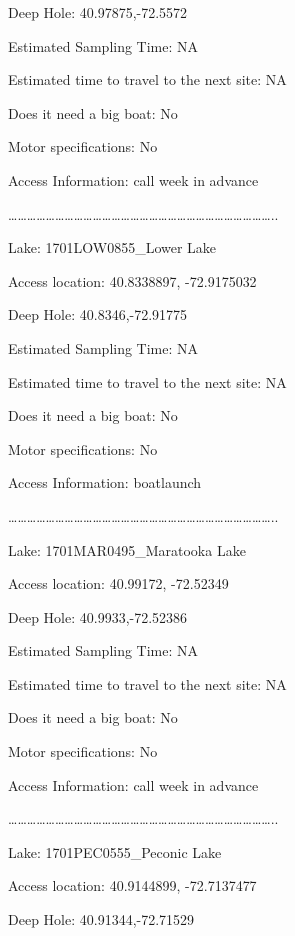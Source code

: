 \documentclass[]{article}
\begin{document}
Deep Hole: 40.97875,-72.5572

Estimated Sampling Time: NA

Estimated time to travel to the next site: NA

Does it need a big boat: No

Motor specifications: No

Access Information: call week in advance

\ldots{}\ldots{}\ldots{}\ldots{}\ldots{}\ldots{}\ldots{}\ldots{}\ldots{}\ldots{}\ldots{}\ldots{}\ldots{}\ldots{}\ldots{}\ldots{}\ldots{}\ldots{}\ldots{}\ldots{}\ldots{}\ldots{}\ldots{}\ldots{}\ldots{}\ldots{}\ldots{}\ldots{}..

Lake: 1701LOW0855\_Lower Lake

Access location: 40.8338897, -72.9175032

Deep Hole: 40.8346,-72.91775

Estimated Sampling Time: NA

Estimated time to travel to the next site: NA

Does it need a big boat: No

Motor specifications: No

Access Information: boatlaunch

\ldots{}\ldots{}\ldots{}\ldots{}\ldots{}\ldots{}\ldots{}\ldots{}\ldots{}\ldots{}\ldots{}\ldots{}\ldots{}\ldots{}\ldots{}\ldots{}\ldots{}\ldots{}\ldots{}\ldots{}\ldots{}\ldots{}\ldots{}\ldots{}\ldots{}\ldots{}\ldots{}\ldots{}..

Lake: 1701MAR0495\_Maratooka Lake

Access location: 40.99172, -72.52349

Deep Hole: 40.9933,-72.52386

Estimated Sampling Time: NA

Estimated time to travel to the next site: NA

Does it need a big boat: No

Motor specifications: No

Access Information: call week in advance

\ldots{}\ldots{}\ldots{}\ldots{}\ldots{}\ldots{}\ldots{}\ldots{}\ldots{}\ldots{}\ldots{}\ldots{}\ldots{}\ldots{}\ldots{}\ldots{}\ldots{}\ldots{}\ldots{}\ldots{}\ldots{}\ldots{}\ldots{}\ldots{}\ldots{}\ldots{}\ldots{}\ldots{}..

Lake: 1701PEC0555\_Peconic Lake

Access location: 40.9144899, -72.7137477

Deep Hole: 40.91344,-72.71529
\end{document}
